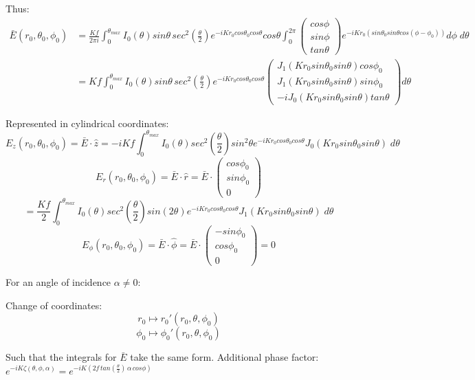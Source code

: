 \documentclass{article}
\begin{document}
    Thus:
    \begin{align*}
        \bar{E}(r_0,\theta_0,\phi_0) &= \frac{Kf}{2\pi i} \int_0^{\theta_{max}} I_0(\theta) sin\theta \, sec^2\left(\frac{\theta}{2}\right)e^{-iKr_0 cos\theta_0 cos\theta} cos\theta \int_0^{2\pi} \begin{pmatrix} cos\phi \\ sin\phi \\ tan\theta \end{pmatrix} e^{-iKr_0(sin\theta_0sin\theta cos(\phi-\phi_0))}d\phi \; d\theta \\ &= Kf \int_0^{\theta_{max}} I_0(\theta) sin\theta \, sec^2\left(\frac{\theta}{2}\right)e^{-iKr_0 cos\theta_0 cos\theta} \begin{pmatrix} J_1(Kr_0sin\theta_0sin\theta)cos\phi_0 \\ J_1(Kr_0sin\theta_0sin\theta)sin\phi_0 \\ -i J_0(Kr_0sin\theta_0sin\theta)tan\theta \end{pmatrix} d\theta
    \end{align*}
    
    Represented in cylindrical coordinates:
    \[E_z(r_0,\theta_0,\phi_0) = \bar{E} \cdot \hat{z} = -iKf \int_0^{\theta_{max}} I_0(\theta)sec^2\left(\frac{\theta}{2}\right) sin^2\theta e^{-iKr_0 cos\theta_0 cos\theta} J_0(Kr_0sin\theta_0sin\theta) \; d\theta\]
    \[E_r(r_0,\theta_0,\phi_0) = \bar{E} \cdot \hat{r} = \bar{E} \cdot \begin{pmatrix} cos\phi_0 \\ sin\phi_0 \\ 0 \end{pmatrix}\]
    \[= \frac{Kf}{2} \int_0^{\theta_{max}} I_0(\theta) sec^2\left(\frac{\theta}{2}\right) sin(2\theta) e^{-iKr_0 cos\theta_0 cos\theta} J_1(Kr_0sin\theta_0 sin\theta) \; d\theta\]
    \[E_{\phi}(r_0,\theta_0,\phi_0) = \bar{E} \cdot \hat{\phi} = \bar{E} \cdot \begin{pmatrix} -sin\phi_0 \\ cos\phi_0 \\ 0 \end{pmatrix} = 0 \]
    
    For an angle of incidence \(\alpha \neq 0\):

    Change of coordinates:
    \[r_0 \mapsto r_0'(r_0,\theta,\phi_0)\]
    \[\phi_0 \mapsto \phi_0'(r_0,\theta,\phi_0)\]
    
    Such that the integrals for \(\bar{E}\) take the same form.
    Additional phase factor: \(e^{-iK\zeta(\theta,\phi,\alpha)} = e^{-iK(2f\,tan\left(\frac{\theta}{2}\right)\, \alpha \, cos\phi)}\)
\end{document}
